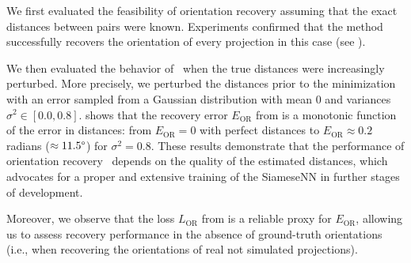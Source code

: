 
We first evaluated the feasibility of orientation recovery assuming that the exact distances between pairs were known.
Experiments confirmed that the method successfully recovers the orientation of every projection in this case (see ).

We then evaluated the behavior of~ when the true distances were increasingly perturbed.
More precisely, we perturbed the distances prior to the minimization with an error sampled from a Gaussian distribution with mean $0$ and variances $\sigma^2 \in [0.0, 0.8]$.
 shows that the recovery error $E_\text{OR}$ from  is a monotonic function of the error in distances: from $E_\text{OR} = 0$ with perfect distances to $E_\text{OR} \approx 0.2$ radians ($\approx 11.5\degree$) for $\sigma^2 = 0.8$.
These results demonstrate that the performance of orientation recovery~ depends on the quality of the estimated distances, which advocates for a proper and extensive training of the SiameseNN in further stages of development.

Moreover, we observe that the loss $L_\text{OR}$ from  is a reliable proxy for $E_\text{OR}$, allowing us to assess recovery performance in the absence of ground-truth orientations (i.e., when recovering the orientations of real not simulated projections).

